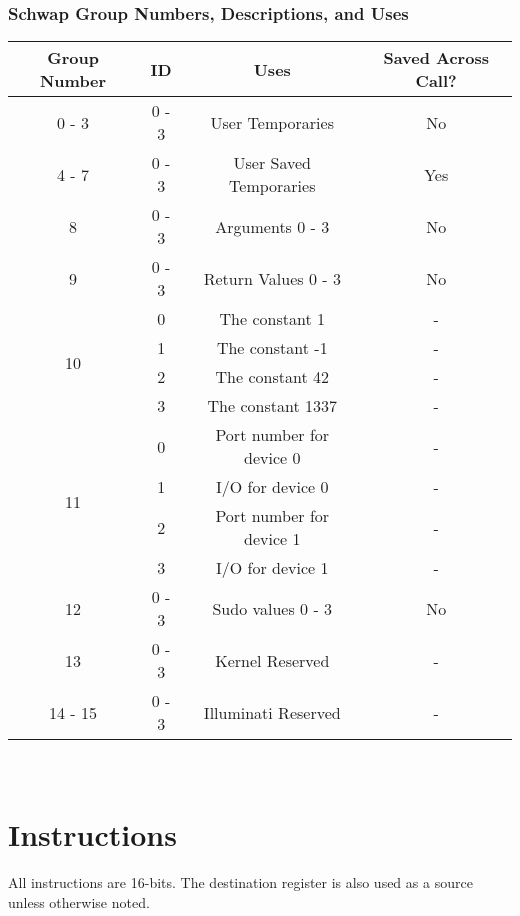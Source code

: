 		\subsubsection{Schwap Group Numbers, Descriptions, and Uses}
			\begin{center}
				\begin{tabular}{| c | c | c | c |} \hline
					Group Number & ID    & Uses                      & Saved Across Call? \\ \hline
					0 - 3        & 0 - 3 & User Temporaries          & No \\ \hline
					4 - 7        & 0 - 3 & User Saved Temporaries    & Yes\\ \hline
					8            & 0 - 3 & Arguments 0 - 3           & No \\ \hline
					9            & 0 - 3 & Return Values 0 - 3       & No \\ \hline
					\multirow{4}{*}{10} & 0 & The constant 1         & -  \\ \cline{2-4}
					             & 1     & The constant -1           & -  \\ \cline{2-4}
					             & 2     & The constant 42           & -  \\ \cline{2-4}
					             & 3     & The constant 1337         & -  \\ \hline
					\multirow{4}{*}{11} & 0 & Port number for device 0 & -\\ \cline{2-4}
					             & 1     & I/O for device 0          & -  \\ \cline{2-4}
					             & 2     & Port number for device 1  & -  \\ \cline{2-4}
					             & 3     & I/O for device 1          & -  \\ \hline
					12           & 0 - 3 & Sudo values 0 - 3         & No \\ \hline
					13           & 0 - 3 & Kernel Reserved           & -  \\ \hline
					14 - 15      & 0 - 3 & Illuminati Reserved       & -  \\ \hline
				\end{tabular} \\
			\end{center}
\section{Instructions}
	All instructions are 16-bits.  The destination register is also used as a source unless otherwise noted.
